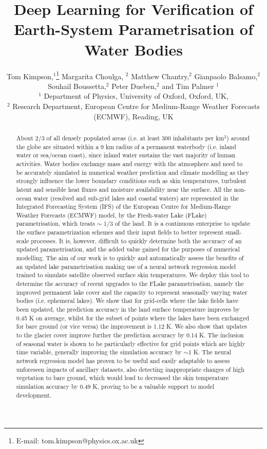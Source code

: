 \documentclass[twocolumn]{article}
\date{}
\title{Deep Learning for Verification of Earth-System Parametrisation of Water Bodies}
\author[Kimpson et al.]{
	Tom Kimpson,$^{1}$\thanks{E-mail: tom.kimpson@physics.ox.ac.uk}
	Margarita Choulga, $^2$
	Matthew Chantry,$^2$
		Gianpaolo Balsamo,$^2$
	Souhail Boussetta,$^2$
		Peter Dueben,$^2$
	and Tim Palmer $^1$ 
	\\
	$^{1}$ \small Department of Physics, University of Oxford, Oxford, UK, \\ \normalsize
	$^{2}$ \small Research Department, European Centre for Medium-Range Weather Forecasts (ECMWF), Reading, UK\normalsize
}
\begin{document}

\maketitle        


\begin{abstract}
About 2/3 of all densely populated areas (i.e. at least 300 inhabitants per km$^2$) around the globe are situated within a 9 km radius of a permanent waterbody (i.e. inland water or sea/ocean coast), since inland water sustains the vast majority of human activities. Water bodies exchange mass and energy with the atmosphere and need to be accurately simulated in numerical weather prediction and climate modelling as they strongly influence the lower boundary conditions such as skin temperatures, turbulent latent and sensible heat fluxes and moisture availability near the surface. All the non-ocean water (resolved and sub-grid lakes and coastal waters) are represented in the Integrated Forecasting System (IFS) of the European Centre for Medium-Range Weather Forecasts (ECMWF) model, by the Fresh-water Lake (FLake) parametrisation, which treats $\sim$ 1/3 of the land. It is a continuous enterprise to update the surface parametrization schemes and their input fields to better represent small-scale processes. It is, however, difficult to quickly determine both the accuracy of an updated parametrisation, and the added value gained for the purposes of numerical modelling. The aim of our work is to quickly and automatically assess the benefits of an updated lake parametrisation making use of a neural network regression model trained to simulate satellite observed surface skin temperatures. We deploy this tool to determine the accuracy of recent upgrades to the FLake parametrisation, namely the improved permanent lake cover and the capacity to represent seasonally varying water bodies (i.e. ephemeral lakes). We show that for grid-cells where the lake fields have been updated, the prediction accuracy in the land surface temperature improves by 0.45 K on average, whilst for the subset of points where the lakes have been exchanged for bare ground (or vice versa) the improvement is 1.12 K. We also show that updates to the glacier cover improve further the prediction accuracy by 0.14 K. The inclusion of seasonal water is shown to be particularly effective for grid points which are highly time variable, generally improving the simulation accuracy by $\sim$1 K. The neural network regression model has proven to be useful and easily adaptable to assess unforeseen impacts of ancillary datasets, also detecting inappropriate changes of high vegetation to bare ground, which would lead to decreased the skin temperature simulation accuracy by 0.49 K, proving to be a valuable support to model development.
\end{abstract}
\end{document}
